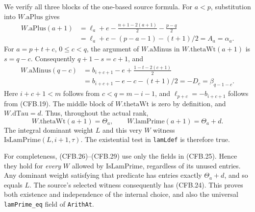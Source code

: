 We verify all three blocks of the one-based source formula.
For \(a<p\), substitution into \(W.\mathrm{aPlus}\) gives
\[
 \begin{split}
 W.\mathrm{aPlus}(a+1)
 &=\ell_a+e-\frac{n+1-2(a+1)}2-\frac{p-q}2\\
 &=\ell_a+e-(p-a-1)-(t+1)/2=A_a=\alpha_a.
 \end{split}                                                    \tag{CFB.27}
\]
For \(a=p+t+c\), \(0\le c<q\), the argument of
\(W.\mathrm{aMinus}\) in \(W.\mathrm{thetaWt}(a+1)\) is
\(s=q-c\).  Consequently \(q+1-s=c+1\), and
\[
 \begin{split}
 W.\mathrm{aMinus}(q-c)
 &=b_{i+c+1}-e+\frac{1-t-2(c+1)}2\\
 &=b_{i+c+1}-e-c-(t+1)/2=-D_c=\beta_{q-1-c}.
 \end{split}                                                    \tag{CFB.28}
\]
Here \(i+c+1<m\) follows from \(c<q=m-i-1\), and
\(\ell_{p+c}=-b_{i+c+1}\) follows from (CFB.19).
The middle block of \(W.\mathrm{thetaWt}\) is zero by definition,
and \(W.\mathrm{dTau}=d\).  Thus, throughout the actual rank,
\[
       W.\mathrm{thetaWt}(a+1)=\Theta_a,
       \qquad W.\mathrm{lamPrime}(a+1)=\Theta_a+d.              \tag{CFB.29}
\]
The integral dominant weight \(L\) and this very \(W\) witness
\(\mathrm{IsLamPrime}(L,i+1,\tau)\).  The existential test in
\texttt{lamLdef} is therefore true.

For completeness, (CFB.26)--(CFB.29) use only the fields in
(CFB.25).  Hence they hold for \emph{every} \(W\) allowed by
\(\mathrm{IsLamPrime}\), regardless of its unused entries.
Any dominant weight satisfying that predicate has entries exactly
\(\Theta_a+d\), and so equals \(L\).
The source's selected witness consequently has (CFB.24).
This proves both existence and independence of the internal choice,
and also the universal \texttt{lamPrime\_eq} field of
\texttt{ArithAt}.

